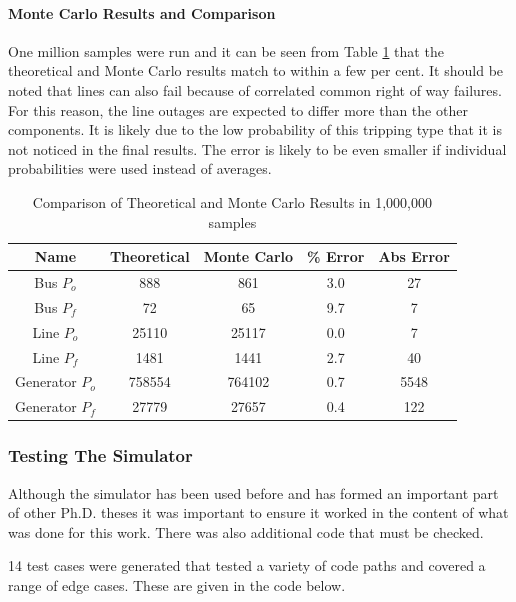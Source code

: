 \documentclass[a4paper,oneside,12pt]{report}
\begin{document}
\paragraph{Monte Carlo Results and Comparison}

One million samples were run and it can be seen from Table \ref{table_cmp} that the theoretical and Monte Carlo results match to within a few per cent. It should be noted that lines can also fail because of correlated common right of way failures. For this reason, the line outages are expected to differ more than the other components. It is likely due to the low probability of this tripping type that it is not noticed in the final results. The error is likely to be even smaller if individual probabilities were used instead of averages.

\begin{table}[!t]
\renewcommand{\arraystretch}{1.3}
\caption{Comparison of Theoretical and Monte Carlo Results in 1,000,000 samples}
\label{table_cmp}
\centering
\begin{tabular}{c||c||c||c||c}
\bfseries Name &\bfseries Theoretical & \bfseries Monte Carlo &
\bfseries \% Error & \bfseries Abs Error\\
\hline\hline
Bus $P_o$	&  888	  &   861     &	 3.0	  &    27    \\
Bus $P_f$	&  72	  &   65      &  9.7	  &    7     \\
Line $P_o$	&  25110  &   25117   &  0.0	  &    7     \\
Line $P_f$	&  1481	  &   1441    &  2.7	  &    40    \\
Generator $P_o$ &  758554 &   764102  &  0.7    &    5548  \\
Generator $P_f$ &  27779  &   27657   &  0.4    &    122   \\
\hline
\end{tabular}
\end{table}

\subsubsection{Testing The Simulator}

Although the simulator has been used before and has formed an important
part of other Ph.D. theses \cite{Dale1986, Berry1989, Chan1992} it was
important to ensure it worked in the content of what was done for this
work. There was also additional code that must be checked.

14 test cases were generated that tested a variety of code paths and
covered a range of edge cases. These are given in the code below.
\end{document}
